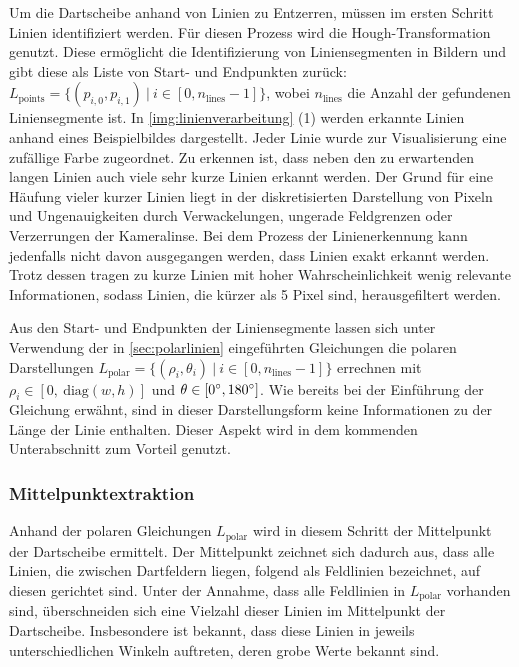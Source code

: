 Um die Dartscheibe anhand von Linien zu Entzerren, müssen im ersten Schritt Linien identifiziert werden. Für diesen Prozess wird die Hough-Transformation genutzt. Diese ermöglicht die Identifizierung von Liniensegmenten in Bildern und gibt diese als Liste von Start- und Endpunkten zurück: $L_\text{points} = \{(p_{i, 0}, p_{i, 1})\ \vert \ i \in [0, n_\text{lines}-1]\}$, wobei $n_\text{lines}$ die Anzahl der gefundenen Liniensegmente ist. In \autoref{img:linienverarbeitung} (1) werden erkannte Linien anhand eines Beispielbildes dargestellt. Jeder Linie wurde zur Visualisierung eine zufällige Farbe zugeordnet. Zu erkennen ist, dass neben den zu erwartenden langen Linien auch viele sehr kurze Linien erkannt werden. Der Grund für eine Häufung vieler kurzer Linien liegt in der diskretisierten Darstellung von Pixeln und Ungenauigkeiten durch Verwackelungen, ungerade Feldgrenzen oder Verzerrungen der Kameralinse. Bei dem Prozess der Linienerkennung kann jedenfalls nicht davon ausgegangen werden, dass Linien exakt erkannt werden. Trotz dessen tragen zu kurze Linien mit hoher Wahrscheinlichkeit wenig relevante Informationen, sodass Linien, die kürzer als 5 Pixel sind, herausgefiltert werden.

Aus den Start- und Endpunkten der Liniensegmente lassen sich unter Verwendung der in \autoref{sec:polarlinien} eingeführten Gleichungen die polaren Darstellungen $L_\text{polar} = \{(\rho_i, \theta_i)\ |\ i \in [0, n_\text{lines}-1]\}$ errechnen mit $\rho_i \in [0,\ \text{diag}(w, h)]$ und $\theta \in [0^{\circ}, 180^{\circ}]$. Wie bereits bei der Einführung der Gleichung erwähnt, sind in dieser Darstellungsform keine Informationen zu der Länge der Linie enthalten. Dieser Aspekt wird in dem kommenden Unterabschnitt zum Vorteil genutzt.

\subsubsection{Mittelpunktextraktion}
\label{sec:mittelpunktextraktion}

Anhand der polaren Gleichungen $L_\text{polar}$ wird in diesem Schritt der Mittelpunkt der Dartscheibe ermittelt. Der Mittelpunkt zeichnet sich dadurch aus, dass alle Linien, die zwischen Dartfeldern liegen, folgend als Feldlinien bezeichnet, auf diesen gerichtet sind. Unter der Annahme, dass alle Feldlinien in $L_\text{polar}$ vorhanden sind, überschneiden sich eine Vielzahl dieser Linien im Mittelpunkt der Dartscheibe. Insbesondere ist bekannt, dass diese Linien in jeweils unterschiedlichen Winkeln auftreten, deren grobe Werte bekannt sind.

